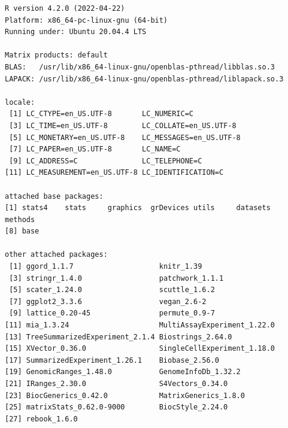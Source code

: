 \documentclass[
]{book}
\begin{document}
\begin{verbatim}
R version 4.2.0 (2022-04-22)
Platform: x86_64-pc-linux-gnu (64-bit)
Running under: Ubuntu 20.04.4 LTS

Matrix products: default
BLAS:   /usr/lib/x86_64-linux-gnu/openblas-pthread/libblas.so.3
LAPACK: /usr/lib/x86_64-linux-gnu/openblas-pthread/liblapack.so.3

locale:
 [1] LC_CTYPE=en_US.UTF-8       LC_NUMERIC=C              
 [3] LC_TIME=en_US.UTF-8        LC_COLLATE=en_US.UTF-8    
 [5] LC_MONETARY=en_US.UTF-8    LC_MESSAGES=en_US.UTF-8   
 [7] LC_PAPER=en_US.UTF-8       LC_NAME=C                 
 [9] LC_ADDRESS=C               LC_TELEPHONE=C            
[11] LC_MEASUREMENT=en_US.UTF-8 LC_IDENTIFICATION=C       

attached base packages:
[1] stats4    stats     graphics  grDevices utils     datasets  methods  
[8] base     

other attached packages:
 [1] ggord_1.1.7                    knitr_1.39                    
 [3] stringr_1.4.0                  patchwork_1.1.1               
 [5] scater_1.24.0                  scuttle_1.6.2                 
 [7] ggplot2_3.3.6                  vegan_2.6-2                   
 [9] lattice_0.20-45                permute_0.9-7                 
[11] mia_1.3.24                     MultiAssayExperiment_1.22.0   
[13] TreeSummarizedExperiment_2.1.4 Biostrings_2.64.0             
[15] XVector_0.36.0                 SingleCellExperiment_1.18.0   
[17] SummarizedExperiment_1.26.1    Biobase_2.56.0                
[19] GenomicRanges_1.48.0           GenomeInfoDb_1.32.2           
[21] IRanges_2.30.0                 S4Vectors_0.34.0              
[23] BiocGenerics_0.42.0            MatrixGenerics_1.8.0          
[25] matrixStats_0.62.0-9000        BiocStyle_2.24.0              
[27] rebook_1.6.0                  


\end{verbatim}
\end{document}

